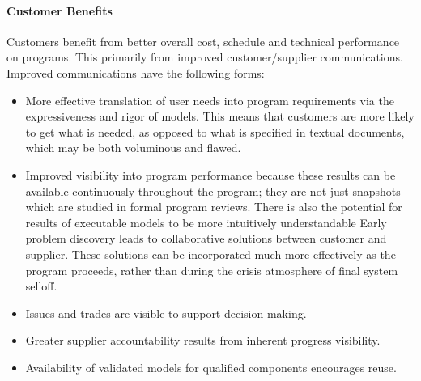 \documentclass[a4paper,12pt,twoside]{report}
\begin{document}
			\paragraph{Customer Benefits} {Customers benefit from better overall cost, schedule and technical performance on  programs. This primarily from improved customer/supplier communications. Improved communications have the following forms: \cite{FoundationalConceptsMDSD}
			}
			\begin{itemize}
				\item More effective translation of user needs into program requirements via the expressiveness and rigor of models. This means that customers are more likely to get what is needed, as opposed to what is specified in textual documents, which may be both voluminous and flawed.
				\item Improved visibility into program performance because these results can be available continuously throughout the program; they are not just snapshots which are studied in formal program reviews. There is also the potential for results of executable models to be more intuitively understandable Early problem discovery leads to collaborative solutions between customer and supplier. These solutions can be incorporated much more effectively as the program proceeds, rather than during the crisis atmosphere of final system selloff.
				\item Issues and trades are visible to support decision making.
				\item Greater supplier accountability results from inherent progress visibility.
				\item Availability of validated models for qualified components encourages reuse.
			\end{itemize}
			
\end{document}
